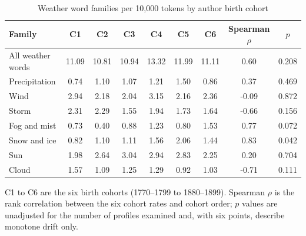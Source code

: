 \begin{table}[t]
\centering
\begin{threeparttable}
\caption{Weather word families per 10,000 tokens by author birth cohort}
\label{tab:families}
\begin{tabular}{lcccccccc}
\toprule
Family & C1 & C2 & C3 & C4 & C5 & C6 & Spearman $\rho$ & $p$ \\
\midrule
All weather words & 11.09 & 10.81 & 10.94 & 13.32 & 11.99 & 11.11 & 0.60 & 0.208 \\
Precipitation & 0.74 & 1.10 & 1.07 & 1.21 & 1.50 & 0.86 & 0.37 & 0.469 \\
Wind & 2.94 & 2.18 & 2.04 & 3.15 & 2.16 & 2.36 & -0.09 & 0.872 \\
Storm & 2.31 & 2.29 & 1.55 & 1.94 & 1.73 & 1.64 & -0.66 & 0.156 \\
Fog and mist & 0.73 & 0.40 & 0.88 & 1.23 & 0.80 & 1.53 & 0.77 & 0.072 \\
Snow and ice & 0.82 & 1.10 & 1.11 & 1.56 & 2.06 & 1.44 & 0.83 & 0.042 \\
Sun & 1.98 & 2.64 & 3.04 & 2.94 & 2.83 & 2.25 & 0.20 & 0.704 \\
Cloud & 1.57 & 1.09 & 1.25 & 1.29 & 0.92 & 1.03 & -0.71 & 0.111 \\
\bottomrule
\end{tabular}
\begin{tablenotes}[flushleft]
\footnotesize
\item C1 to C6 are the six birth cohorts (1770--1799 to 1880--1899). Spearman $\rho$ is the rank correlation between the six cohort rates and cohort order; $p$ values are unadjusted for the number of profiles examined and, with six points, describe monotone drift only.
\end{tablenotes}
\end{threeparttable}
\end{table}
